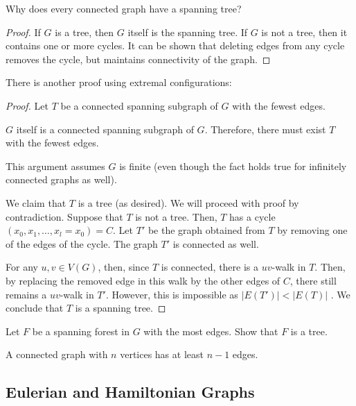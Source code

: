 
Why does every connected graph have a spanning tree?
\begin{proof}
	If \( G \) is a tree, then \( G \) itself is the spanning tree. If \( G \) is not a tree, then it contains one or more cycles. It can be shown that deleting edges from any cycle removes the cycle, but maintains connectivity of the graph.
\end{proof}

There is another proof using extremal configurations:
\begin{proof}
	Let \( T \) be a connected spanning subgraph of \( G \) with the fewest edges.
	\begin{note}
		\( G \) itself is a connected spanning subgraph of \( G \). Therefore, there must exist \( T \) with the fewest edges.
	\end{note}
	\begin{remark}
		This argument assumes \( G \) is finite (even though the fact holds true for infinitely connected graphs as well).
	\end{remark}
	We claim that \( T \) is a tree (as desired). We will proceed with proof by contradiction. Suppose that \( T \) is not a tree. Then, \( T \) has a cycle \( (x_{0}, x_{1}, \ldots , x_l = x_{0}) = C\). Let \( T' \) be the graph obtained from \( T \) by removing one of the edges of the cycle. The graph \( T' \) is connected as well. \par
	For any \( u,v \in V(G) \), then, since \( T \) is connected, there is a \( uv \)-walk in \( T \). Then, by replacing the removed edge in this walk by the other edges of \( C \), there still remains a \( uv \)-walk in \( T' \). However, this is impossible as \( |E(T')| < |E(T)| \) \contra. We conclude that \( T \) is a spanning tree.
\end{proof}

Let \( F \) be a spanning forest in \( G \) with the most edges. Show that \( F \) is a tree.

\begin{corollary}
	A connected graph with \( n \) vertices has at least \( n-1 \) edges.
\end{corollary}

\subsection{Eulerian and Hamiltonian Graphs}

